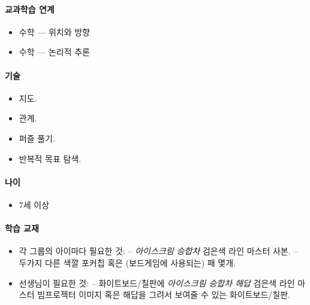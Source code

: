 \documentclass[]{article}
\begin{document}
\mbox{}\paragraph{교과학습 연계}\label{section-199}

\begin{itemize}
\itemsep1pt\parskip0pt
\item
  수학 --- 위치와 방향
\item
  수학 --- 논리적 추론
\end{itemize}

\mbox{}\paragraph{기술}\label{section-200}

\begin{itemize}
\itemsep1pt\parskip0pt
\item
  지도.
\item
  관계.
\item
  퍼즐 풀기.
\item
  반복적 목표 탐색.
\end{itemize}

\mbox{}\paragraph{나이}\label{section-201}

\begin{itemize}
\itemsep1pt\parskip0pt
\item
  7세 이상
\end{itemize}

\mbox{}\paragraph{학습 교재}\label{section-202}

\begin{itemize}
\itemsep1pt\parskip0pt
\item
  각 그룹의 아이마다 필요한 것: -- \emph{아이스크림 승합차} 검은색 라인
  마스터 사본. -- 두가지 다른 색깔 포커칩 혹은 (보드게임에 사용되는) 패
  몇개.
\item
  선생님이 필요한 것: -- 화이트보드/칠판에 \emph{아이스크림 승합차 해답}
  검은색 라인 마스터 빔프로젝터 이미지 혹은 해답을 그려서 보여줄 수 있는
  화이트보드/칠판.
\end{itemize}

\end{document}
